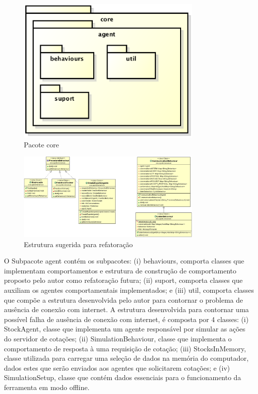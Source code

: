 \begin{figure}[h]
\centering
\label{f31}
\includegraphics[width=0.8\textwidth]{figuras/pacoteAgents}
\caption{Pacote core}
\end{figure}

\begin{figure}[h]
\centering
\label{f32}
\includegraphics[width=0.8\textwidth]{figuras/pacoteBehaviours}
\caption{Estrutura sugerida para refatoração}
\end{figure}


O Subpacote agent contém os subpacotes: (i) behaviours, comporta classes que implementam comportamentos e estrutura de construção de comportamento proposto pelo autor como refatoração futura; (ii) suport, comporta classes que auxiliam os agentes comportamentais implementados; e (iii) util, comporta classes que compõe a estrutura desenvolvida pelo autor para contornar o problema de ausência de conexão com internet. A estrutura desenvolvida para contornar uma possível falha de ausência de conexão com internet, é composta por 4 classes: (i) StockAgent, classe que implementa um agente responsável por simular as ações do servidor de cotações; (ii) SimulationBehaviour, classe que implementa o comportamento de resposta à uma requisição de cotação; (iii) StocksInMemory, classe utilizada para carregar uma seleção de dados na memória do computador, dados estes que serão enviados aos agentes que solicitarem cotações; e (iv) SimulationSetup, classe que contém dados essenciais para o funcionamento da ferramenta em modo offline.

